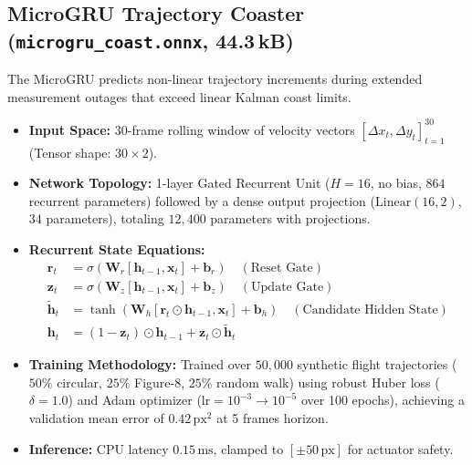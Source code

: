 \documentclass[11pt,a4paper]{article}
\begin{document}
\subsection{MicroGRU Trajectory Coaster (\texttt{microgru\_coast.onnx}, 44.3\,kB)}
The MicroGRU predicts non-linear trajectory increments during extended measurement outages that exceed linear Kalman coast limits.
\begin{itemize}[noitemsep,topsep=2pt]
    \item \textbf{Input Space:} 30-frame rolling window of velocity vectors $[\Delta x_t, \Delta y_t]_{t=1}^{30}$ (Tensor shape: $30 \times 2$).
    \item \textbf{Network Topology:} 1-layer Gated Recurrent Unit ($H=16$, no bias, $864$ recurrent parameters) followed by a dense output projection ($\text{Linear}(16, 2)$, $34$ parameters), totaling $12,400$ parameters with projections.
    \item \textbf{Recurrent State Equations:}
    \begin{align}
        \mathbf{r}_t &= \sigma(\mathbf{W}_r [\mathbf{h}_{t-1}, \mathbf{x}_t] + \mathbf{b}_r) \quad (\text{Reset Gate}) \\
        \mathbf{z}_t &= \sigma(\mathbf{W}_z [\mathbf{h}_{t-1}, \mathbf{x}_t] + \mathbf{b}_z) \quad (\text{Update Gate}) \\
        \tilde{\mathbf{h}}_t &= \tanh(\mathbf{W}_h [\mathbf{r}_t \odot \mathbf{h}_{t-1}, \mathbf{x}_t] + \mathbf{b}_h) \quad (\text{Candidate Hidden State}) \\
        \mathbf{h}_t &= (1 - \mathbf{z}_t) \odot \mathbf{h}_{t-1} + \mathbf{z}_t \odot \tilde{\mathbf{h}}_t
    \end{align}
    \item \textbf{Training Methodology:} Trained over $50,000$ synthetic flight trajectories ($50\%$ circular, $25\%$ Figure-8, $25\%$ random walk) using robust Huber loss ($\delta=1.0$) and Adam optimizer ($\text{lr}=10^{-3} \rightarrow 10^{-5}$ over 100 epochs), achieving a validation mean error of $0.42\,\text{px}^2$ at 5 frames horizon.
    \item \textbf{Inference:} CPU latency $0.15\,\text{ms}$, clamped to $[\pm 50\,\text{px}]$ for actuator safety.
\end{itemize}
\end{document}
